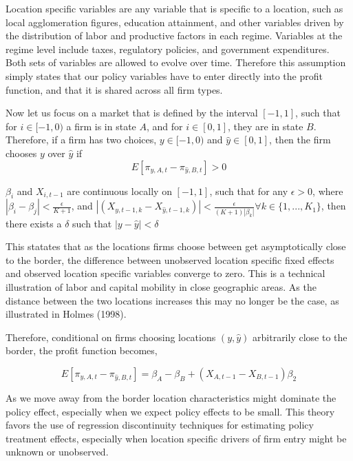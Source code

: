 Location specific variables are any variable that is specific to a location, such as local agglomeration figures, education attainment, and other variables driven by the distribution of labor and productive factors in each regime. Variables at the regime level include taxes, regulatory policies, and government expenditures. Both sets of variables are allowed to evolve over time. Therefore this assumption simply states that our policy variables have to enter directly into the profit function, and that it is shared across all firm types.

Now let us focus on a market that is defined by the interval $[-1,1]$, such that for $i \in [-1,0)$ a firm is in state $A$, and for $i \in [0,1]$, they are in state $B$. Therefore, if a firm has two choices, $y \in [-1,0)$ and $\hat y \in [0,1]$, then the firm chooses $y$ over $\hat y$ if
\begin{equation}\label{diff}
E[\pi_{y,A,t}-\pi_{\hat y,B,t}] > 0
\end{equation}

\begin{assumption}\label{cont}
$\beta_{i}$ and $X_{i,t-1}$ are continuous locally on $[-1,1]$, such that for any $\epsilon > 0$, where  $|\beta_{i}-\beta_{j}| < \frac{\epsilon}{K+1}$, and $|(X_{y,t-1,k}-X_{\hat y,t-1,k})| < \frac{\epsilon}{(K+1)|\beta_{k}|} \forall k \in \{1,...,K_{1}\}$, then there exists a $\delta$ such that $|y - \hat y| < \delta$
\end{assumption}

This statates that as the locations firms choose between get asymptotically close to the border, the difference between unobserved location specific fixed effects and observed location specific variables converge to zero. This is a technical illustration of labor and capital mobility in close geographic areas. As the distance between the two locations increases this may no longer be the case, as illustrated in Holmes (1998).

Therefore, conditional on firms choosing locations $(y, \hat y)$ arbitrarily close to the border, the profit function becomes,

\begin{equation}\label{prof}
E[\pi_{y,A,t}-\pi_{\hat y, B, t}] =  \beta_{A}-\beta_{B}+(X_{A,t-1}-X_{B,t-1})\beta_{2}
\end{equation}

As we move away from the border location characteristics might dominate the policy effect, especially when we expect policy effects to be small. This theory favors the use of regression discontinuity techniques for estimating policy treatment effects, especially when location specific drivers of firm entry might be unknown or unobserved.